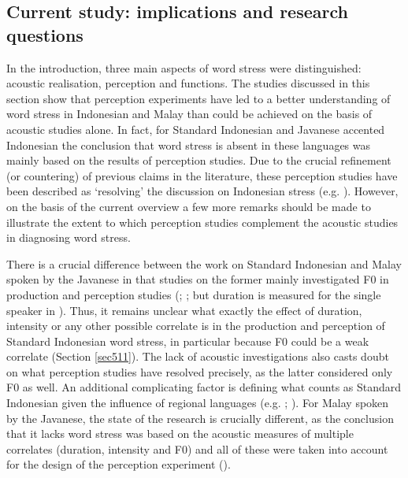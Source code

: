 \subsection{Current study: implications and research questions} \label{sec524}
\largerpage
In the introduction, three main aspects of word stress were distinguished: acoustic realisation, perception and functions. The studies discussed in this section show that perception experiments have led to a better understanding of word stress in Indonesian and Malay than could be achieved on the basis of acoustic studies alone. In fact, for Standard Indonesian and Javanese accented Indonesian the conclusion that word stress is absent in these languages was mainly based on the results of perception studies. Due to the crucial refinement (or countering) of previous claims in the literature, these perception studies have been described as `resolving' the discussion on Indonesian stress (e.g. \citealt[101]{vanzanten_stress_2010}). However, on the basis of the current overview a few more remarks should be made to illustrate the extent to which perception studies complement the acoustic studies in diagnosing word stress.\par

There is a crucial difference between the work on Standard Indonesian and Malay spoken by the Javanese in that studies on the former mainly investigated F0 in production and perception studies (\citealt{laksman_location_1994}; \citealt{vanzanten_word_1998}; but duration is measured for the single speaker in \citealt{vanzanten_word_2004}). Thus, it remains unclear what exactly the effect of duration, intensity or any other possible correlate is in the production and perception of Standard Indonesian word stress, in particular because F0 could be a weak correlate (Section \ref{sec511}). The lack of acoustic investigations also casts doubt on what perception studies have resolved precisely, as the latter considered only F0 as well. An additional complicating factor is defining what counts as Standard Indonesian given the influence of regional languages (e.g. \citealt{vanzanten_indonesian_1984}; \citealt{vanheuven_effects_1997}). For Malay spoken by the Javanese, the state of the research is crucially different, as the conclusion that it lacks word stress was based on the acoustic measures of multiple correlates (duration, intensity and F0) and all of these were taken into account for the design of the perception experiment (\citealt{goedemans_stress_2007}).\par

